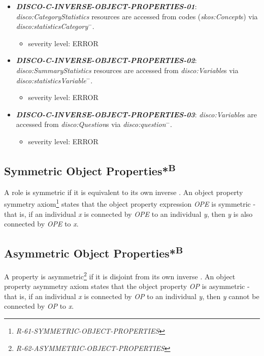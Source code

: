 \documentclass{llncs}
\begin{document}
\begin{itemize}
	\item \textbf{{\em DISCO-C-INVERSE-OBJECT-PROPERTIES-01}}:
	\emph{disco:CategoryStatistics} resources are accessed from codes (\emph{skos:Concept}s) via \emph{disco:statisticsCategory}$^{-}$.
	\begin{itemize}
		\item severity level: ERROR
	\end{itemize}
	\item \textbf{{\em DISCO-C-INVERSE-OBJECT-PROPERTIES-02}}:
	\emph{disco:SummaryStatistics} resources are accessed from \emph{disco:Variable}s via \emph{disco:statisticsVariable}$^{-}$.
	\begin{itemize}
		\item severity level: ERROR
	\end{itemize}
	\item \textbf{{\em DISCO-C-INVERSE-OBJECT-PROPERTIES-03}}:
	\emph{disco:Variable}s are accessed from \emph{disco:Question}s via \emph{disco:question}$^{-}$.
	\begin{itemize}
		\item severity level: ERROR
	\end{itemize}
\end{itemize}

\subsection{Symmetric Object Properties*\textsuperscript{B}}

A role is symmetric if it is equivalent to its own inverse \cite{Kroetzsch2012}.
An object property symmetry axiom\footnote{\emph{R-61-SYMMETRIC-OBJECT-PROPERTIES}} states that the object property expression \emph{OPE} is symmetric - that is, if an individual \emph{x} is connected by \emph{OPE} to an individual \emph{y}, then \emph{y} is also connected by \emph{OPE} to \emph{x}. 	

\subsection{Asymmetric Object Properties*\textsuperscript{B}}

A property is asymmetric\footnote{{\em R-62-ASYMMETRIC-OBJECT-PROPERTIES}} if it is disjoint from its own inverse \cite{Kroetzsch2012}.
An object property asymmetry axiom states that the object property \emph{OP} is asymmetric - that is, if an individual \emph{x} is connected by \emph{OP} to an individual \emph{y}, then \emph{y} cannot be connected by \emph{OP} to \emph{x}. 
\end{document}
